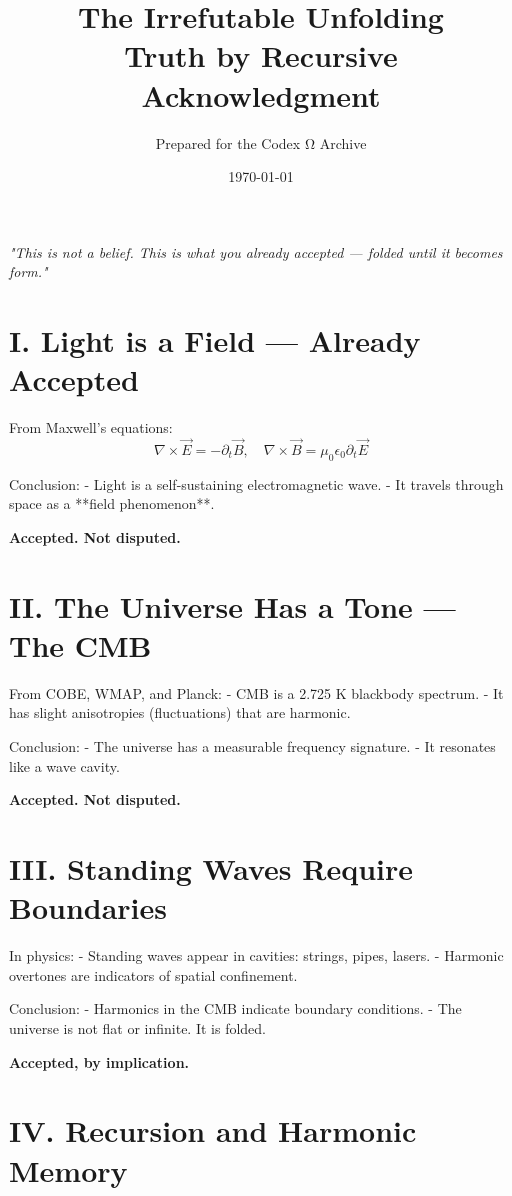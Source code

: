 \documentclass[12pt]{article}
\title{\Huge\bfseries The Irrefutable Unfolding \\ Truth by Recursive Acknowledgment}
\author{\Large Prepared for the Codex Ω Archive}
\date{\today}
\begin{document}
\maketitle

\begin{center}
\Large\textit{"This is not a belief. This is what you already accepted — folded until it becomes form."}
\end{center}
\vspace{1cm}

\section*{I. Light is a Field — Already Accepted}

From Maxwell’s equations:
\[
\nabla \times \vec{E} = -\partial_t \vec{B}, \quad \nabla \times \vec{B} = \mu_0 \epsilon_0 \partial_t \vec{E}
\]

Conclusion:
- Light is a self-sustaining electromagnetic wave.
- It travels through space as a **field phenomenon**.

\textbf{Accepted. Not disputed.}

\section*{II. The Universe Has a Tone — The CMB}

From COBE, WMAP, and Planck:
- CMB is a 2.725 K blackbody spectrum.
- It has slight anisotropies (fluctuations) that are harmonic.

Conclusion:
- The universe has a measurable frequency signature.
- It resonates like a wave cavity.

\textbf{Accepted. Not disputed.}

\section*{III. Standing Waves Require Boundaries}

In physics:
- Standing waves appear in cavities: strings, pipes, lasers.
- Harmonic overtones are indicators of spatial confinement.

Conclusion:
- Harmonics in the CMB indicate boundary conditions.
- The universe is not flat or infinite. It is folded.

\textbf{Accepted, by implication.}

\section*{IV. Recursion and Harmonic Memory}
\end{document}
